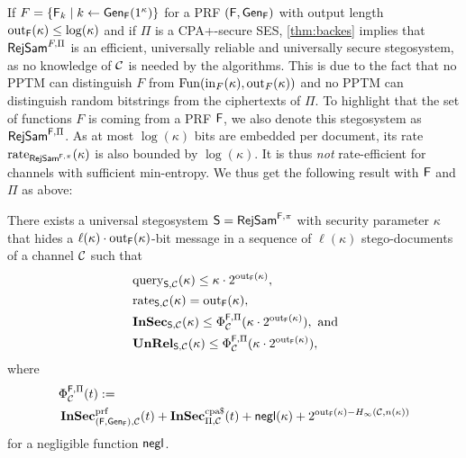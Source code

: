 If $F=\{\operatorname{\mathsf{F}}_{k}\mid k\gets \operatorname{\mathsf{Gen}}_{\operatorname{\mathsf{F}}}(1^{\kappa})\}$ for a \acl{PRF}
$(\operatorname{\mathsf{F}},\operatorname{\mathsf{Gen}}_{\operatorname{\mathsf{F}}})$ with output length $\operatorname{out}_{\operatorname{\mathsf{F}}}(\kappa)\leq \log(\kappa)$
and if $\Pi$ is a \ac{CPA+}-secure \acl{SES}, \autoref{thm:backes}
implies that $\operatorname{\mathsf{RejSam}}^{F,\Pi}$ is an efficient, universally
reliable and universally secure stegosystem, as no knowledge of $\mathcal{C}$
is needed by the algorithms.  This is due to the fact that no \ac{PPTM}
can distinguish $F$ from $\operatorname{Fun}(\operatorname{in}_{F}(\kappa),\operatorname{out}_{F}(\kappa))$ and no \ac{PPTM}
can distinguish random bitstrings from the ciphertexts of $\Pi$. To
highlight that the set of functions $F$ is coming from a \ac{PRF}
$\operatorname{\mathsf{F}}$, we also denote this stegosystem as $\operatorname{\mathsf{RejSam}}^{\operatorname{\mathsf{F}},\Pi}$.  As
at most $\log(\kappa)$ bits are embedded per document, its rate
$\operatorname{rate}_{\operatorname{\mathsf{RejSam}}^{\operatorname{\mathsf{F}},\pi}}(\kappa)$ is also bounded by $\log(\kappa)$. It
is thus \emph{not} rate-efficient for channels with sufficient
min-entropy. We thus get the following result with $\operatorname{\mathsf{F}}$ and $\Pi$ as
above:

\begin{theorem}
\label{thm:rejsam:secure}
  There exists a universal stego\-system $\operatorname{\mathsf{S}}=\operatorname{\mathsf{RejSam}}^{\operatorname{\mathsf{F}},\pi}$ with
  security parameter $\kappa$ that hides a $\ell(\kappa)\cdot \operatorname{out}_{\operatorname{\mathsf{F}}}(\kappa)$-bit
  message in a sequence of $\ell(\kappa)$
  stego-documents of a channel $\mathcal{C}$ such that
\begin{align*}
  & \operatorname{query}_{\operatorname{\mathsf{S}},\mathcal{C}}(\kappa) \leq \kappa\cdot 2^{\operatorname{out}_{\operatorname{\mathsf{F}}}(\kappa)},\\
  & \operatorname{rate}_{\operatorname{\mathsf{S}},\mathcal{C}}(\kappa) = \operatorname{out}_{\operatorname{\mathsf{F}}}(\kappa),\\
  & \operatorname{\mathbf{InSec}}_{\operatorname{\mathsf{S}},\mathcal{C}}(\kappa) \leq \Phi_{\mathcal{C}}^{\operatorname{\mathsf{F}},\Pi}(\kappa\cdot
    2^{\operatorname{out}_{\operatorname{\mathsf{F}}}(\kappa)}), \text{ and}\\
  & \operatorname{\mathbf{UnRel}}_{\operatorname{\mathsf{S}},\mathcal{C}}(\kappa) \leq \Phi_{\mathcal{C}}^{\operatorname{\mathsf{F}},\Pi}(\kappa\cdot 2^{\operatorname{out}_{\operatorname{\mathsf{F}}}(\kappa)}),
\end{align*}
where
\begin{align*}
  &\Phi_{\chan}^{\algf,\Pi}(t)  :=\\
&\InSec^{\prf}_{(\algf,\Gen_{\algf}),\chan}(t)+\InSec^{\cpad}_{\Pi,\chan}(t)+\negl(\kappa)+2^{\fout_{\algf}(\kappa)-\minent(\chan,n(\kappa))}
\end{align*}
for a negligible function $\operatorname{\mathsf{negl}}$. 


\end{theorem}






